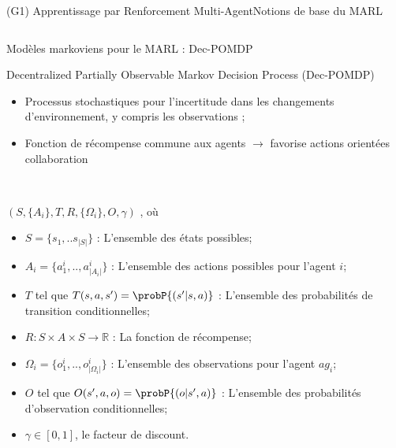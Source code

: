 \begin{frame}{(G1) Apprentissage par Renforcement Multi-Agent}{Notions de base du MARL}
\begin{columns}
\begin{column}{0.7\textwidth}
            \begin{center}
                \begin{minipage}{0.95\linewidth}
                    \centering
                    \begin{block}{Modèles markoviens pour le MARL : Dec-POMDP}
                        {\small
                            Decentralized Partially Observable Markov Decision Process (Dec-POMDP)~\parencite{Oliehoek2016}
                            \begin{itemize}
                                \item Processus stochastiques pour l'incertitude dans les changements d'environnement, y compris les observations ;
                                \item Fonction de récompense commune aux agents $\rightarrow$ favorise actions orientées collaboration~\parencite{Beynier2013}
                            \end{itemize}
                        }
                        \

                        { \scriptsize

                        $(S,\{A_i\},T,R,\{\Omega_i\},O,\gamma)$ , où
                        \begin{itemize}
                            \item $S = \{s_1, ..s_{|S|}\}$ : L'ensemble des états possibles;
                            \item $A_{i} = \{a_{1}^{i},..,a_{|A_{i}|}^{i}\}$ : L'ensemble des actions possibles pour l'agent $i$;
                            \item $T$ tel que $T(s,a,s') = \probP{(s'|s,a)}$ : L'ensemble des probabilités de transition conditionnelles;
                            \item $R: S \times A \times S \rightarrow \mathbb{R}$ : La fonction de récompense;
                            \item $\Omega_{i} = \{o_{1}^{i},..,o_{|\Omega_{i}|}^{i}\}$ : L'ensemble des observations pour l'agent $ag_i$;
                            \item $O$ tel que $O(s',a,o) = \probP{(o|s',a)}$ : L'ensemble des probabilités d'observation conditionnelles;
                            \item $\gamma \in [0,1]$, le facteur de discount.
                        \end{itemize}

                        }

                    \end{block}

                \end{minipage}
            \end{center}

        \end{column}

    \end{columns}

\end{frame}

